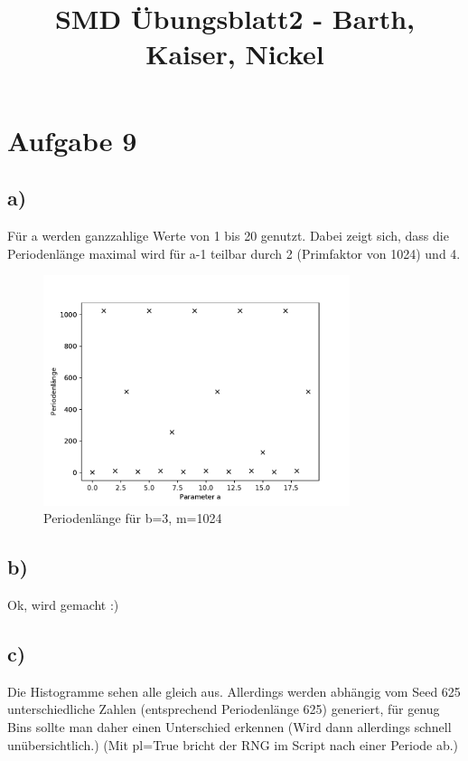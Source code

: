

\title{SMD Übungsblatt2 - Barth, Kaiser, Nickel}



\section{Aufgabe 9}
\subsection{a)}
Für a werden ganzzahlige Werte von 1 bis 20 genutzt.
Dabei zeigt sich, dass die Periodenlänge maximal wird für 
a-1 teilbar durch 2 (Primfaktor von 1024) und 4. 

\begin{figure}[H]
  \centering
  \includegraphics[width=0.8\textwidth]{nr8_a.pdf}
  \caption{Periodenlänge für b=3, m=1024}
\end{figure}


\subsection{b)}
Ok, wird gemacht :)

\subsection{c)}
Die Histogramme sehen alle gleich aus.
Allerdings werden abhängig vom Seed 625 unterschiedliche 
Zahlen (entsprechend Periodenlänge 625) generiert, für genug Bins sollte 
man daher einen Unterschied erkennen (Wird dann allerdings 
schnell unübersichtlich.)
(Mit pl=True bricht der RNG im Script 
nach einer Periode ab.)

